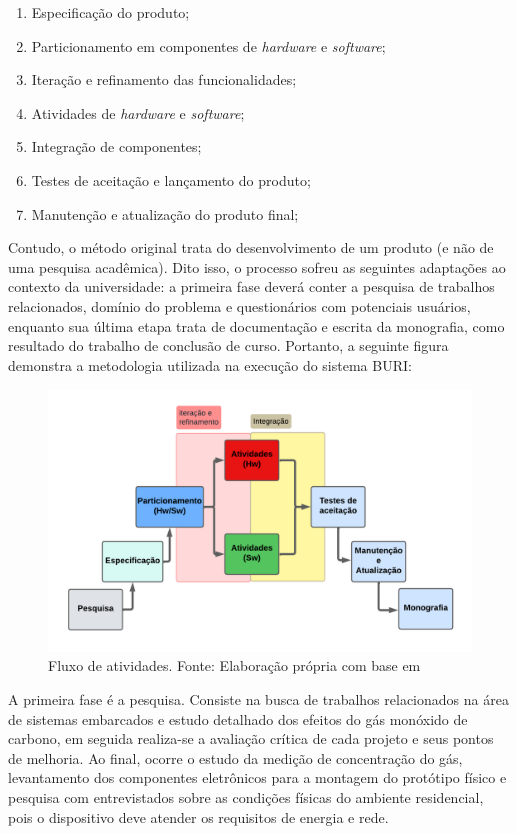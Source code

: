 \begin{enumerate}
    \item Especificação do produto;
    \item Particionamento em componentes de \textit{hardware} e \textit{software};
    \item Iteração e refinamento das funcionalidades;
    \item Atividades de \textit{hardware} e \textit{software};
    \item Integração de componentes;
    \item Testes de aceitação e lançamento do produto;
    \item Manutenção e atualização do produto final;
\end{enumerate}

Contudo, o método original trata do desenvolvimento de um produto (e não de uma pesquisa acadêmica). Dito isso, o processo sofreu as seguintes 
adaptações ao contexto da universidade: a primeira fase deverá conter a pesquisa de trabalhos relacionados, domínio do problema e questionários com potenciais usuários, enquanto sua última etapa trata de documentação e escrita 
da monografia, como resultado do trabalho de conclusão de curso. Portanto, a seguinte figura demonstra a metodologia utilizada na execução do sistema BURI: 

\begin{figure}[ht]
\centering
\includegraphics[width=.75\textwidth]{img/diagrama-metodologia.png}
\caption{Fluxo de atividades. Fonte: Elaboração própria com base  em \cite{system-design-IOT}}\label{figMetodologia}
\end{figure}

A primeira fase é a pesquisa. Consiste na busca de trabalhos relacionados na área de sistemas embarcados 
e estudo detalhado dos efeitos do gás monóxido de carbono, em seguida realiza-se a avaliação crítica de cada projeto 
e seus pontos de melhoria. Ao final, ocorre o estudo da medição de concentração do gás, levantamento dos componentes 
eletrônicos para a montagem do protótipo físico e pesquisa com entrevistados sobre as condições físicas do ambiente residencial, pois o
dispositivo deve atender os requisitos de energia e rede.

